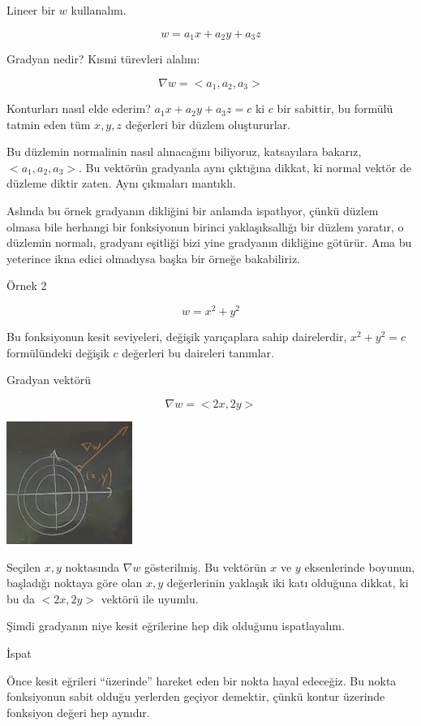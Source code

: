 \documentclass[12pt,fleqn]{article}\usepackage{../../common}
\begin{document}
Lineer bir $w$ kullanalım. 

$$ w = a_1 x + a_2 y + a_3 z $$

Gradyan nedir? Kısmi türevleri alalım:

$$
\nabla w = < a_1, a_2, a_3 >
$$

Konturları nasıl elde ederim? $a_1 x + a_2 y + a_3 z  = c$ ki $c$ bir
sabittir, bu formülü tatmin eden tüm $x,y,z$ değerleri bir düzlem
oluştururlar. 

Bu düzlemin normalinin nasıl alınacağını biliyoruz, katsayılara bakarız,
$< a_1,a_2,a_3 >$. Bu vektörün gradyanla aynı çıktığına dikkat, ki normal vektör de
düzleme diktir zaten. Aynı çıkmaları mantıklı.

Aslında bu örnek gradyanın dikliğini bir anlamda ispatlıyor, çünkü düzlem olmasa
bile herhangi bir fonksiyonun birinci yaklaşıksallığı bir düzlem yaratır, o
düzlemin normalı, gradyanı eşitliği bizi yine gradyanın dikliğine götürür. Ama
bu yeterince ikna edici olmadıysa başka bir örneğe bakabiliriz.

Örnek 2

$$ w = x^2 + y^2 $$

Bu fonksiyonun kesit seviyeleri, değişik yarıçaplara sahip dairelerdir,
$x^2 + y^2 = c$ formülündeki değişik $c$ değerleri bu daireleri tanımlar. 

Gradyan vektörü

$$ \nabla w = <2x, 2y> $$

\includegraphics[height=4cm]{12_2.png}

Seçilen $x,y$ noktasında $\nabla w$ gösterilmiş. Bu vektörün $x$ ve $y$
eksenlerinde boyunun, başladığı noktaya göre olan $x,y$ değerlerinin
yaklaşık iki katı olduğuna dikkat, ki bu da $< 2x,2y >$ vektörü ile uyumlu. 

Şimdi gradyanın niye kesit eğrilerine hep dik olduğunu ispatlayalım.

İspat

Önce kesit eğrileri ``üzerinde'' hareket eden bir nokta hayal edeceğiz. Bu
nokta fonksiyonun sabit olduğu yerlerden geçiyor demektir, çünkü kontur
üzerinde fonksiyon değeri hep aynıdır. 
\end{document}
